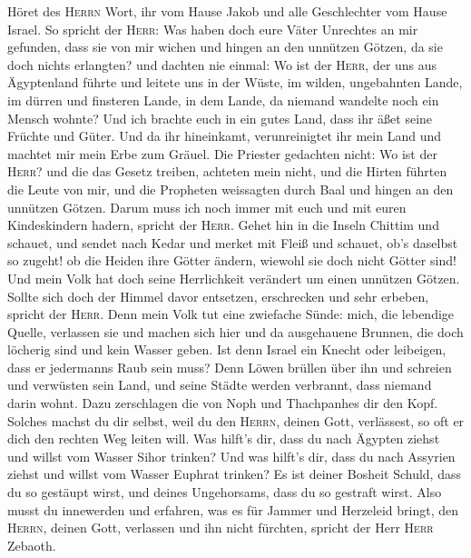  Höret des \textsc{Herrn} Wort, ihr vom Hause Jakob und
alle Geschlechter vom Hause Israel.  So spricht der
\textsc{Herr}: Was haben doch eure Väter Unrechtes an mir gefunden, dass
sie von mir wichen und hingen an den unnützen Götzen, da sie doch nichts
erlangten?  und dachten nie einmal: Wo ist der
\textsc{Herr}, der uns aus Ägyptenland führte und leitete uns in der
Wüste, im wilden, ungebahnten Lande, im dürren und finsteren Lande, in
dem Lande, da niemand wandelte noch ein Mensch wohnte? 
Und ich brachte euch in ein gutes Land, dass ihr äßet seine Früchte und
Güter. Und da ihr hineinkamt, verunreinigtet ihr mein Land und machtet
mir mein Erbe zum Gräuel.  Die Priester gedachten nicht:
Wo ist der \textsc{Herr}? und die das Gesetz treiben, achteten mein
nicht, und die Hirten führten die Leute von mir, und die Propheten
weissagten durch Baal und hingen an den unnützen Götzen. 
Darum muss ich noch immer mit euch und mit euren Kindeskindern hadern,
spricht der \textsc{Herr}.  Gehet hin in die Inseln
Chittim und schauet, und sendet nach Kedar und merket mit Fleiß und
schauet, ob's daselbst so zugeht!  ob die Heiden ihre
Götter ändern, wiewohl sie doch nicht Götter sind! Und mein Volk hat
doch seine Herrlichkeit verändert um einen unnützen Götzen.
 Sollte sich doch der Himmel davor entsetzen, erschrecken
und sehr erbeben, spricht der \textsc{Herr}.  Denn mein
Volk tut eine zwiefache Sünde: mich, die lebendige Quelle, verlassen sie
und machen sich hier und da ausgehauene Brunnen, die doch löcherig sind
und kein Wasser geben.  Ist denn Israel ein Knecht oder
leibeigen, dass er jedermanns Raub sein muss?  Denn Löwen
brüllen über ihn und schreien und verwüsten sein Land, und seine Städte
werden verbrannt, dass niemand darin wohnt.  Dazu
zerschlagen die von Noph und Thachpanhes dir den Kopf. 
Solches machst du dir selbst, weil du den \textsc{Herrn}, deinen Gott,
verlässest, so oft er dich den rechten Weg leiten will. 
Was hilft's dir, dass du nach Ägypten ziehst und willst vom Wasser Sihor
trinken? Und was hilft's dir, dass du nach Assyrien ziehst und willst
vom Wasser Euphrat trinken?  Es ist deiner Bosheit
Schuld, dass du so gestäupt wirst, und deines Ungehorsams, dass du so
gestraft wirst. Also musst du innewerden und erfahren, was es für Jammer
und Herzeleid bringt, den \textsc{Herrn}, deinen Gott, verlassen und ihn
nicht fürchten, spricht der Herr \textsc{Herr} Zebaoth. 
